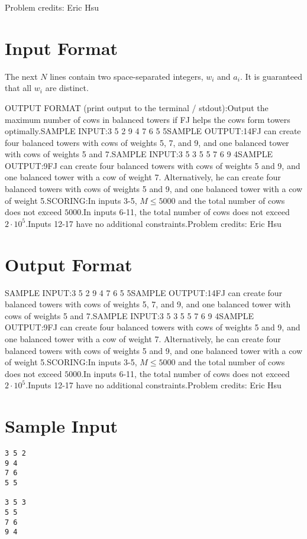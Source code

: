 \documentclass[12pt]{article}
\begin{document}
Problem credits: Eric Hsu



\section*{Input Format}
The next $N$ lines contain two space-separated integers, $w_{i}$ and $a_i$. It
is guaranteed that all $w_i$ are distinct.

OUTPUT FORMAT (print output to the terminal / stdout):Output the maximum number of cows in balanced towers if FJ helps the cows form towers
optimally.SAMPLE INPUT:3 5 2
9 4
7 6
5 5SAMPLE OUTPUT:14FJ can create four balanced towers with cows of weights 5, 7, and 9, and one balanced tower with
cows of weights 5 and 7.SAMPLE INPUT:3 5 3
5 5
7 6
9 4SAMPLE OUTPUT:9FJ can create four balanced towers with cows of weights 5 and 9, and one balanced tower with a cow
of weight 7. Alternatively, he can create four balanced towers with cows of weights 5 and
9, and one balanced tower with a cow of weight 5.SCORING:In inputs 3-5, $M \leq 5000$ and the total number of cows does not exceed
$5000$.In inputs 6-11, the total number of cows does not exceed $2\cdot 10^5$.Inputs 12-17 have no additional constraints.Problem credits: Eric Hsu

\section*{Output Format}
SAMPLE INPUT:3 5 2
9 4
7 6
5 5SAMPLE OUTPUT:14FJ can create four balanced towers with cows of weights 5, 7, and 9, and one balanced tower with
cows of weights 5 and 7.SAMPLE INPUT:3 5 3
5 5
7 6
9 4SAMPLE OUTPUT:9FJ can create four balanced towers with cows of weights 5 and 9, and one balanced tower with a cow
of weight 7. Alternatively, he can create four balanced towers with cows of weights 5 and
9, and one balanced tower with a cow of weight 5.SCORING:In inputs 3-5, $M \leq 5000$ and the total number of cows does not exceed
$5000$.In inputs 6-11, the total number of cows does not exceed $2\cdot 10^5$.Inputs 12-17 have no additional constraints.Problem credits: Eric Hsu

\section*{Sample Input}
\begin{verbatim}
3 5 2
9 4
7 6
5 5

3 5 3
5 5
7 6
9 4
\end{verbatim}
\end{document}
